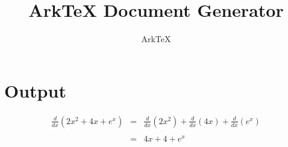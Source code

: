 \documentclass[dvips, 12pt, twoside]{article}
\begin{document}
\title{ArkTeX Document Generator}
\author{ArkTeX}
\maketitle

\medskip

\section*{Output}
\begin{Large}
\begin{eqnarray*}
\frac{d}{dx}(2x^2+4x+e^{x})&=&\frac{d}{dx}(2x^2)+\frac{d}{dx}(4x)+\frac{d}{dx}(e^{x})\\
\\
&=&4x+4+e^{x}\\
\\
\end{eqnarray*}
\end{Large}
\end{document}

